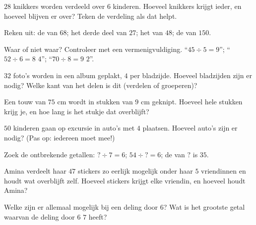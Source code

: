 \begin{exercise}[$\star$]\label{exo:g3:division:3}
$28$ knikkers worden verdeeld over $6$ kinderen. Hoeveel knikkers krijgt
ieder, en hoeveel blijven er over? Teken de verdeling als dat helpt.
\end{exercise}

\begin{exercise}[$\star$]\label{exo:g3:division:4}
Reken uit: de  van $68$; het derde deel van $27$; het  van
$48$; de  van $150$.
\end{exercise}

\begin{exercise}[$\star$]\label{exo:g3:division:5}
Waar of niet waar? Controleer met een vermenigvuldiging.
``$45 \div 5 = 9$''; \quad ``$52 \div 6 = 8$  $4$'';
\quad ``$70 \div 8 = 9$  $2$''.
\end{exercise}

\begin{exercise}[$\star$]\label{exo:g3:division:6}
$32$ foto's worden in een album geplakt, $4$ per bladzijde. Hoeveel
bladzijden zijn er nodig? Welke kant van het delen is dit (verdelen of
groeperen)?
\end{exercise}

\begin{exercise}[$\star$]\label{exo:g3:division:7}
Een touw van $75$ cm wordt in stukken van $9$ cm geknipt. Hoeveel hele
stukken krijg je, en hoe lang is het stukje dat overblijft?
\end{exercise}

\begin{exercise}[$\star$]\label{exo:g3:division:8}
$50$ kinderen gaan op excursie in auto's met $4$ plaatsen. Hoeveel auto's
zijn er nodig? (Pas op: iedereen moet mee!)
\end{exercise}

\begin{exercise}[$\star$]\label{exo:g3:division:9}
Zoek de ontbrekende getallen: $? \div 7 = 6$; \quad
$54 \div ? = 6$; \quad de  van $?$ is $35$.
\end{exercise}

\begin{exercise}[$\star\star$]\label{exo:g3:division:10}
Amina verdeelt haar $47$ stickers zo eerlijk mogelijk onder haar $5$
vriendinnen en houdt wat overblijft zelf. Hoeveel stickers krijgt elke
vriendin, en hoeveel houdt Amina?
\end{exercise}

\begin{exercise}[$\star\star$]\label{exo:g3:division:11}
Welke  zijn er allemaal mogelijk bij een deling door $6$? Wat is
het grootste getal waarvan de deling door $6$  $7$ heeft?
\end{exercise}
